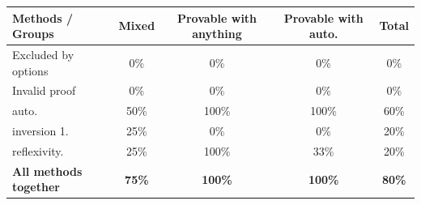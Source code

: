 \begin{table}
\centering
\begin{tabular}{lcccc}
\toprule
\textbf{Methods / Groups} & \textbf{Mixed} & \textbf{Provable with anything} & \textbf{Provable with auto.} & \textbf{Total} \\
\midrule
Excluded by options & 0\% & 0\% & 0\% & 0\% \\
Invalid proof & 0\% & 0\% & 0\% & 0\% \\
auto. & 50\% & 100\% & 100\% & 60\% \\
inversion 1. & 25\% & 0\% & 0\% & 20\% \\
reflexivity. & 25\% & 100\% & 33\% & 20\% \\
\textbf{All methods together} & \textbf{75\%} & \textbf{100\%} & \textbf{100\%} & \textbf{80\%} \\
\bottomrule
\end{tabular}
\end{table}